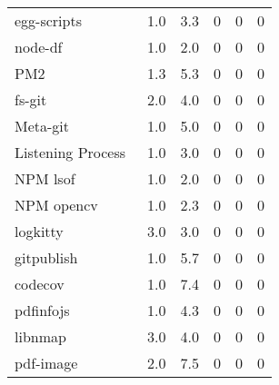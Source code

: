 \begin{table}[]
{\begin{tabular}{l r r r r r}
	
	egg-scripts~\cite{eggscripts} &
	1.0 & 3.3&
	0 & 0 & 0
	 \\
	
	
	node-df~\cite{node-df} &
	1.0 & 2.0 &
	0 & 0 & 0
	 \\
	
	
	PM2~\cite{PM2} &
	1.3 & 5.3&
	0 & 0 & 0
	 \\
	
	
	fs-git~\cite{fs-git} &
    2.0 & 4.0 &
	0 & 0 & 0
	 \\
	
	
	Meta-git~\cite{meta-git} &
	1.0 & 5.0 &
	0 & 0 & 0
	 \\
	
	
	Listening Process~\cite{listening-processes} &
    1.0 & 3.0 &
	0 & 0 & 0
	 \\
	
	
	NPM lsof~\cite{lsof} &
	1.0 & 2.0 &
	0 & 0 & 0
	 \\
    
		
	NPM opencv~\cite{opencv} &
	1.0 & 2.3 &
	0 & 0 & 0
	 \\
    
		
	logkitty~\cite{logkitty} &
	3.0 & 3.0 &
	0 & 0 & 0
	 \\
    
		
	gitpublish~\cite{git-publish} &
	1.0 & 5.7 &
	0 & 0 & 0
	 \\
		
	codecov~\cite{codecov} &
	1.0 & 7.4 &
	0 & 0 & 0
	 \\
	
	pdfinfojs~\cite{pdfinfojs} &
	1.0 & 4.3 &
	0 & 0 & 0
	 \\
    
	
	libnmap~\cite{libnmap} &
	3.0 & 4.0 &
	0 & 0 & 0
	 \\
    
		
	pdf-image~\cite{PDF-image} &
	2.0 & 7.5 &
	0 & 0 & 0
	 \\
	\bottomrule 
\end{tabular}}
\end{table}